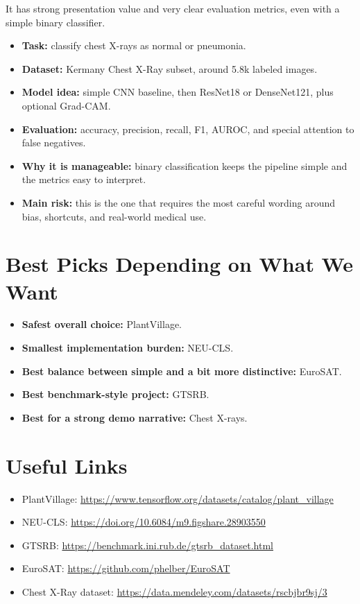 \documentclass[11pt,a4paper]{article}
\begin{document}
It has strong presentation value and very clear evaluation metrics, even with a simple binary classifier.

\begin{itemize}
\item \textbf{Task:} classify chest X-rays as normal or pneumonia.
\item \textbf{Dataset:} Kermany Chest X-Ray subset, around 5.8k labeled images.
\item \textbf{Model idea:} simple CNN baseline, then ResNet18 or DenseNet121, plus optional Grad-CAM.
\item \textbf{Evaluation:} accuracy, precision, recall, F1, AUROC, and special attention to false negatives.
\item \textbf{Why it is manageable:} binary classification keeps the pipeline simple and the metrics easy to interpret.
\item \textbf{Main risk:} this is the one that requires the most careful wording around bias, shortcuts, and real-world medical use.
\end{itemize}

\section{Best Picks Depending on What We Want}

\begin{itemize}
\item \textbf{Safest overall choice:} PlantVillage.
\item \textbf{Smallest implementation burden:} NEU-CLS.
\item \textbf{Best balance between simple and a bit more distinctive:} EuroSAT.
\item \textbf{Best benchmark-style project:} GTSRB.
\item \textbf{Best for a strong demo narrative:} Chest X-rays.
\end{itemize}

\section{Useful Links}

\begin{itemize}
\item PlantVillage: \url{https://www.tensorflow.org/datasets/catalog/plant_village}
\item NEU-CLS: \url{https://doi.org/10.6084/m9.figshare.28903550}
\item GTSRB: \url{https://benchmark.ini.rub.de/gtsrb_dataset.html}
\item EuroSAT: \url{https://github.com/phelber/EuroSAT}
\item Chest X-Ray dataset: \url{https://data.mendeley.com/datasets/rscbjbr9sj/3}
\end{itemize}
\end{document}
